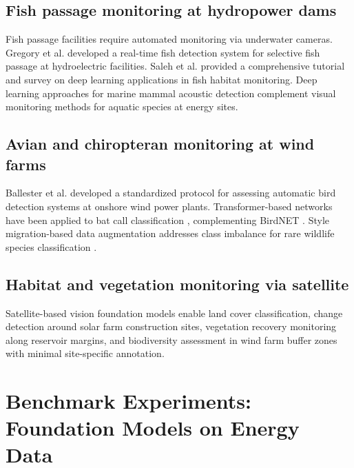 \documentclass[preprint,12pt]{elsarticle}
\begin{document}
\subsection{Fish passage monitoring at hydropower dams}
\label{subsec:fish_passage}

Fish passage facilities require automated monitoring via underwater cameras. Gregory et al. \cite{gregory2025fish_passage_dl} developed a real-time fish detection system for selective fish passage at hydroelectric facilities. Saleh et al. \cite{saleh2024dl_fish_habitat} provided a comprehensive tutorial and survey on deep learning applications in fish habitat monitoring. Deep learning approaches for marine mammal acoustic detection \cite{hamard2024marine_mammal_acoustic_dl} complement visual monitoring methods for aquatic species at energy sites.

\subsection{Avian and chiropteran monitoring at wind farms}
\label{subsec:avian}

Ballester et al. \cite{ballester2024bird_detection_wind} developed a standardized protocol for assessing automatic bird detection systems at onshore wind power plants. Transformer-based networks have been applied to bat call classification \cite{fundel2023bat_call_transformer}, complementing BirdNET \cite{kahl2021birdnet}. Style migration-based data augmentation addresses class imbalance for rare wildlife species classification \cite{zhang2023wildlife_augmentation_cyclegan}.

\subsection{Habitat and vegetation monitoring via satellite}
\label{subsec:habitat}

Satellite-based vision foundation models \cite{he2022masked, huo2025remote_sensing_foundation_models} enable land cover classification, change detection around solar farm construction sites, vegetation recovery monitoring along reservoir margins, and biodiversity assessment in wind farm buffer zones \cite{pettorelli2024dl_satellite_biodiversity, tuia2022wildlife_remote_sensing} with minimal site-specific annotation.

\section{Benchmark Experiments: Foundation Models on Energy Data}
\label{sec:benchmarks}
\end{document}
